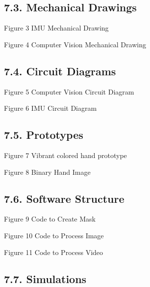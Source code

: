 \documentclass[10pt]{article}
\begin{document}
\subsection{7.3. Mechanical Drawings}

Figure 3 IMU Mechanical Drawing

Figure 4 Computer Vision Mechanical Drawing



\subsection{7.4. Circuit Diagrams}

Figure 5 Computer Vision Circuit Diagram

Figure 6 IMU Circuit Diagram



\subsection{7.5. Prototypes}

Figure 7 Vibrant colored hand prototype

Figure 8 Binary Hand Image



\subsection{7.6. Software Structure}










Figure 9 Code to Create Mask

Figure 10 Code to Process Image

Figure 11 Code to Process Video



\subsection{7.7. Simulations}
\end{document}
